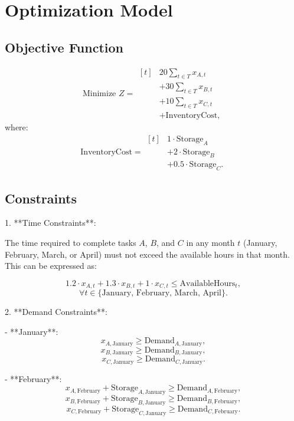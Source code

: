 \documentclass[12pt]{article}
\begin{document}
\section*{Optimization Model}

\subsection*{Objective Function}
\[
\text{Minimize } Z =
\begin{aligned}[t]
    & 20 \sum_{t \in T} x_{A,t} \\
    & + 30 \sum_{t \in T} x_{B,t} \\
    & + 10 \sum_{t \in T} x_{C,t} \\
    & + \text{InventoryCost},
\end{aligned}
\]
where:
\[
\text{InventoryCost} =
\begin{aligned}[t]
    & 1 \cdot \text{Storage}_{A} \\
    & + 2 \cdot \text{Storage}_{B} \\
    & + 0.5 \cdot \text{Storage}_{C}.
\end{aligned}
\]

\subsection*{Constraints}

1. **Time Constraints**:

The time required to complete tasks \( A \), \( B \), and \( C \) in any month \( t \) (January, February, March, or April) must not exceed the available hours in that month. This can be expressed as:

\[
1.2 \cdot x_{A,t} + 
1.3 \cdot x_{B,t} + 
1 \cdot x_{C,t} \leq \text{AvailableHours}_t, 
\]
\[
\forall t \in \{\text{January, February, March, April}\}.
\]

2. **Demand Constraints**:

- **January**:
\[
x_{A,\text{January}} \geq \text{Demand}_{A,\text{January}},
\]
\[
x_{B,\text{January}} \geq \text{Demand}_{B,\text{January}},
\]
\[
x_{C,\text{January}} \geq \text{Demand}_{C,\text{January}}.
\]

- **February**:
\[
x_{A,\text{February}} + \text{Storage}_{A,\text{January}} \geq \text{Demand}_{A,\text{February}},
\]
\[
x_{B,\text{February}} + \text{Storage}_{B,\text{January}} \geq \text{Demand}_{B,\text{February}},
\]
\[
x_{C,\text{February}} + \text{Storage}_{C,\text{January}} \geq \text{Demand}_{C,\text{February}}.
\]
\end{document}
